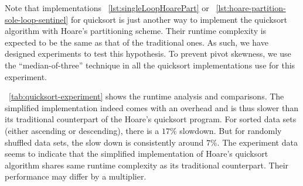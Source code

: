 Note that implementations ~\autoref{lst:singleLoopHoarePart} or
~\autoref{lst:hoare-partition-sole-loop-sentinel} for quicksort is just another way to implement
the quicksort algorithm with Hoare's partitioning scheme.
Their runtime complexity is expected to be the same as that of the traditional ones.
As such, we have designed experiments to test this hypothesis.
To prevent pivot skewness, we use the ``median-of-three'' technique
in all the quicksort implementations use for this experiment\cite{sedgewick1977,sedgewick:1978}.


~\autoref{tab:quicksort-experiment} shows the runtime analysis and comparisons.
The simplified implementation indeed comes with an overhead and is thus slower than
its traditional counterpart of the Hoare's quicksort program.
For sorted data sets (either ascending or descending), there is a $17\%$ slowdown.
But for randomly shuffled data sets, the slow down is consistently around $7\%$.
The experiment data seems to indicate that the simplified
implementation of Hoare's quicksort algorithm shares same runtime complexity as its
traditional counterpart.
Their performance may differ by a multiplier.


